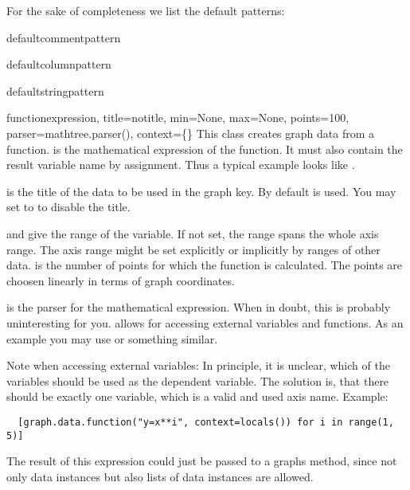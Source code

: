For the sake of completeness we list the default patterns:

\begin{memberdesc}{defaultcommentpattern}
\end{memberdesc}

\begin{memberdesc}{defaultcolumnpattern}
\end{memberdesc}

\begin{memberdesc}{defaultstringpattern}
\end{memberdesc}

\begin{classdesc}{function}{expression, title=notitle,
                            min=None, max=None, points=100,
                            parser=mathtree.parser(),
                            context=\{\}}
  This class creates graph data from a function.  is
  the mathematical expression of the function. It must also contain
  the result variable name by assignment. Thus a typical example looks
  like .

   is the title of the data to be used in the graph key. By
  default  is used. You may set  to
   to disable the title.

   and  give the range of the variable. If not set,
  the range spans the whole axis range. The axis range might be set
  explicitly or implicitly by ranges of other data.  is
  the number of points for which the function is calculated. The
  points are choosen linearly in terms of graph coordinates.

   is the parser for the mathematical expression. When in
  doubt, this is probably uninteresting for you.  allows
  for accessing external variables and functions. As an example you
  may use  or something similar.

  Note when accessing external variables: In principle, it is unclear, 
  which of the variables should be used as the
  dependent variable. The solution is, that there should be exactly
  one variable, which is a valid and used axis name.
  Example:
  \begin{verbatim}
  [graph.data.function("y=x**i", context=locals()) for i in range(1, 5)]
  \end{verbatim}
  The result of this expression could just be passed to a graphs
   method, since not only data instances but also lists
  of data instances are allowed.
\end{classdesc}

